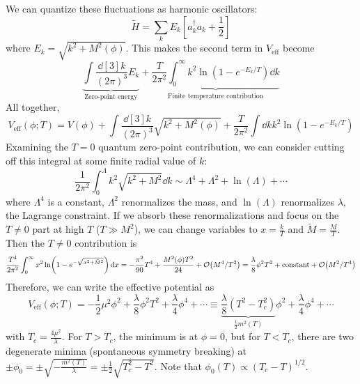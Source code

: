 \documentclass[a4paper,twoside,master.tex]{subfiles}
\begin{document}
We can quantize these fluctuations as harmonic oscillators:
\begin{equation}
    \tilde{H} = \sum_k E_k \left[ a^\dagger_k a_k + \frac{1}{2} \right]
\end{equation}
where $ E_k = \sqrt{k^2 + M^2(\phi)} $. This makes the second term in $ V_{\text{eff}} $ become
\begin{equation}
    \underbrace{\int \frac{\dd[3]{k}}{(2 \pi)^3} E_k}_{\text{Zero-point energy}} + \underbrace{\frac{T}{2 \pi^2} \int_0^{\infty} k^2 \ln(1 - e^{- E_k / T}) \dd{k}}_{\text{Finite temperature contribution}}
\end{equation}
All together,
\begin{equation}
    V_{\text{eff}}(\phi ; T) = V(\phi) + \int \frac{\dd[3]{k}}{(2 \pi)^3} \sqrt{k^2 + M^2(\phi)} + \frac{T}{2 \pi^2} \int \dd{k} k^2 \ln(1 - e^{- E_k / T})
\end{equation}
Examining the $ T=0 $ quantum zero-point contribution, we can consider cutting off this integral at some finite radial value of $ k $:
\begin{equation}
    \frac{1}{2 \pi^2} \int_0^{\Lambda} k^2 \sqrt{k^2 + M^2} \dd{k} \sim \Lambda^4 + \Lambda^2 + \ln(\Lambda) + \cdots
\end{equation}
where $ \Lambda^4 $ is a constant, $ \Lambda^2 $ renormalizes the mass, and $ \ln(\Lambda) $ renormalizes $ \lambda $, the Lagrange constraint. If we absorb these renormalizations and focus on the $ T \neq 0 $ part at high $ T $ ($ T \gg M^2 $), we can change variables to $ x = \frac{k}{T} $ and $ \tilde{M} = \frac{M}{T} $. Then the $ T \neq 0 $ contribution is
\begin{equation}
    \frac{T^4}{2 \pi^2} \int_0^{\infty} x^2 \ln(1 - e^{- \sqrt{x^2 + \tilde{M}^2}}) \dd{x} = - \frac{\pi^2}{90} T^4 + \frac{M^2(\phi) T^2}{24} + \order{M^4/T^2} = \frac{\lambda}{8} \phi^2 T^2 + \text{constant} + \order{M^2 / T^4} 
\end{equation}
Therefore, we can write the effective potential as
\begin{equation}
    V_{\text{eff}}(\phi ; T) = - \frac{1}{2} \mu^2 \phi^2 + \frac{\lambda}{8} \phi^2 T^2 + \frac{\lambda}{4} \phi^4 + \cdots \equiv \underbrace{\frac{\lambda}{8} (T^2 - T_c^2)}_{\frac{1}{2} m^2(T)} \phi^2 + \frac{\lambda}{4} \phi^4 + \cdots\tag{Landau-Ginzburg Free Energy Density}
\end{equation}
with $ T_c = \frac{4 \mu^2}{\lambda} $. For $ T > T_c $, the minimum is at $ \phi = 0 $, but for $ T < T_c $, there are two degenerate minima (spontaneous symmetry breaking) at $ \pm \phi_0 = \pm \sqrt{- \frac{m^2(T)}{\lambda}} = \pm \frac{1}{2} \sqrt{T_c^2 - T^2} $. Note that $ \phi_0(T) \propto (T_c - T)^{1/2} $.
\end{document}
